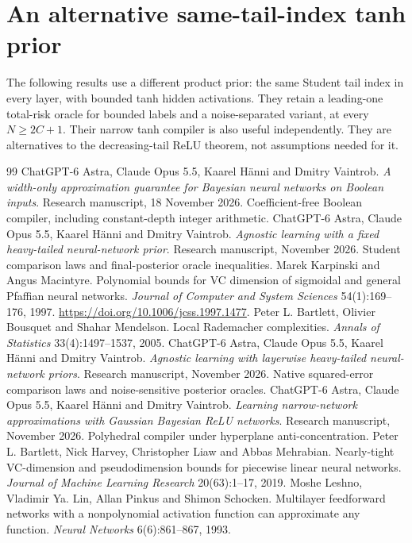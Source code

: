 \documentclass[11pt]{article}
\begin{document}
\section*{An alternative same-tail-index tanh prior}
The following results use a different product prior: the same Student tail index in every layer, with bounded tanh hidden activations. They retain a leading-one total-risk oracle for bounded labels and a noise-separated variant, at every $N\ge2C+1$. Their narrow tanh compiler is also useful independently. They are alternatives to the decreasing-tail ReLU theorem, not assumptions needed for it.



\begin{thebibliography}{99}
 ChatGPT-6 Astra, Claude Opus 5.5, Kaarel H\"anni and Dmitry Vaintrob. \emph{A width-only approximation guarantee for Bayesian neural networks on Boolean inputs}. Research manuscript, 18 November 2026. Coefficient-free Boolean compiler, including constant-depth integer arithmetic.
 ChatGPT-6 Astra, Claude Opus 5.5, Kaarel H\"anni and Dmitry Vaintrob. \emph{Agnostic learning with a fixed heavy-tailed neural-network prior}. Research manuscript, November 2026. Student comparison laws and final-posterior oracle inequalities.
 Marek Karpinski and Angus Macintyre. Polynomial bounds for VC dimension of sigmoidal and general Pfaffian neural networks. \emph{Journal of Computer and System Sciences} 54(1):169--176, 1997. \url{https://doi.org/10.1006/jcss.1997.1477}.
 Peter L. Bartlett, Olivier Bousquet and Shahar Mendelson. Local Rademacher complexities. \emph{Annals of Statistics} 33(4):1497--1537, 2005.
 ChatGPT-6 Astra, Claude Opus 5.5, Kaarel H\"anni and Dmitry Vaintrob. \emph{Agnostic learning with layerwise heavy-tailed neural-network priors}. Research manuscript, November 2026. Native squared-error comparison laws and noise-sensitive posterior oracles.
 ChatGPT-6 Astra, Claude Opus 5.5, Kaarel H\"anni and Dmitry Vaintrob. \emph{Learning narrow-network approximations with Gaussian Bayesian ReLU networks}. Research manuscript, November 2026. Polyhedral compiler under hyperplane anti-concentration.
 Peter L. Bartlett, Nick Harvey, Christopher Liaw and Abbas Mehrabian. Nearly-tight VC-dimension and pseudodimension bounds for piecewise linear neural networks. \emph{Journal of Machine Learning Research} 20(63):1--17, 2019.
 Moshe Leshno, Vladimir Ya. Lin, Allan Pinkus and Shimon Schocken. Multilayer feedforward networks with a nonpolynomial activation function can approximate any function. \emph{Neural Networks} 6(6):861--867, 1993.

\end{thebibliography}
\end{document}
